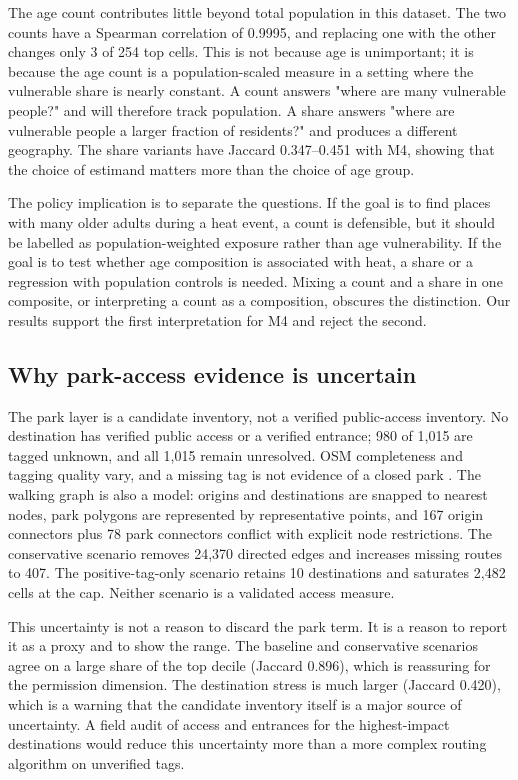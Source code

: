 \documentclass[times,twoside]{_Templates/MultiTargetManuscript}
\begin{document}
The age count contributes little beyond total population in this dataset. The
two counts have a Spearman correlation of 0.9995, and replacing one with the
other changes only 3 of 254 top cells. This is not because age is unimportant;
it is because the age count is a population-scaled measure in a setting where the
vulnerable share is nearly constant. A count answers "where are many vulnerable
people?" and will therefore track population. A share answers "where are
vulnerable people a larger fraction of residents?" and produces a different
geography. The share variants have Jaccard 0.347--0.451 with M4, showing that the
choice of estimand matters more than the choice of age group.

The policy implication is to separate the questions. If the goal is to find
places with many older adults during a heat event, a count is defensible, but it
should be labelled as population-weighted exposure rather than age vulnerability.
If the goal is to test whether age composition is associated with heat, a share
or a regression with population controls is needed. Mixing a count and a share in
one composite, or interpreting a count as a composition, obscures the
distinction. Our results support the first interpretation for M4 and reject the
second.

\subsection{Why park-access evidence is uncertain}

The park layer is a candidate inventory, not a verified public-access inventory.
No destination has verified public access or a verified entrance; 980 of 1,015
are tagged unknown, and all 1,015 remain unresolved. OSM completeness and
tagging quality vary, and a missing tag is not evidence of a closed park
\citep{haklay2010,barron2014,herfort2023}. The walking graph is also a model:
origins and destinations are snapped to nearest nodes, park polygons are
represented by representative points, and 167 origin connectors plus 78 park
connectors conflict with explicit node restrictions. The conservative scenario
removes 24,370 directed edges and increases missing routes to 407. The
positive-tag-only scenario retains 10 destinations and saturates 2,482 cells at
the cap. Neither scenario is a validated access measure.

This uncertainty is not a reason to discard the park term. It is a reason to
report it as a proxy and to show the range. The baseline and conservative
scenarios agree on a large share of the top decile (Jaccard 0.896), which is
reassuring for the permission dimension. The destination stress is much larger
(Jaccard 0.420), which is a warning that the candidate inventory itself is a
major source of uncertainty. A field audit of access and entrances for the
highest-impact destinations would reduce this uncertainty more than a more
complex routing algorithm on unverified tags.
\end{document}
